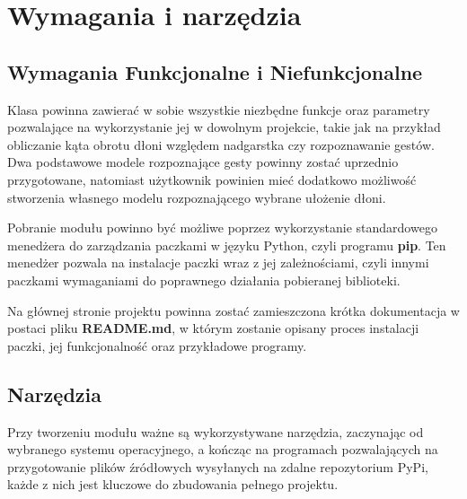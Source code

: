 \chapter{Wymagania i narzędzia}



\section{Wymagania Funkcjonalne i Niefunkcjonalne}

\quad Klasa powinna zawierać w sobie wszystkie niezbędne funkcje oraz parametry pozwalające na wykorzystanie jej w dowolnym projekcie, takie jak na przykład obliczanie kąta obrotu dłoni względem nadgarstka czy rozpoznawanie gestów. Dwa podstawowe modele rozpoznające gesty powinny zostać uprzednio przygotowane, natomiast użytkownik powinien mieć dodatkowo możliwość stworzenia własnego modelu rozpoznającego wybrane ułożenie dłoni. 

\quad Pobranie modułu powinno być możliwe poprzez wykorzystanie standardowego menedżera do zarządzania paczkami w języku Python, czyli programu \textbf{pip}. Ten menedżer pozwala na instalacje paczki wraz z jej zależnościami, czyli innymi paczkami wymaganiami do poprawnego działania pobieranej biblioteki. 

\quad Na głównej stronie projektu powinna zostać zamieszczona krótka dokumentacja w postaci pliku \textbf{README.md}, w którym zostanie opisany proces instalacji paczki, jej funkcjonalność oraz przykładowe programy. 

\section{Narzędzia}

\quad Przy tworzeniu modułu ważne są wykorzystywane narzędzia, zaczynając od wybranego systemu operacyjnego, a kończąc na programach pozwalających na przygotowanie plików źródłowych wysyłanych na zdalne repozytorium PyPi, każde z nich jest kluczowe do zbudowania pełnego projektu. 


